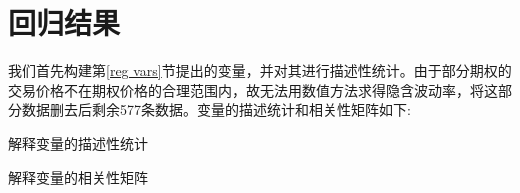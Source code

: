 \section{回归结果}
我们首先构建第\ref{reg vars}节提出的变量，并对其进行描述性统计。由于部分期权的交易价格不在期权价格的合理范围内，故无法用数值方法求得隐含波动率，将这部分数据删去后剩余577条数据。变量的描述统计和相关性矩阵如下:
\newpage
{}
\begin{landscape} 
    \begin{table}[H]
        \caption{解释变量的描述性统计}
        \resizebox{\linewidth}{!}{
        
        }
    \end{table}
    \begin{table}[H]
        \caption{解释变量的相关性矩阵}
        \resizebox{\linewidth}{!}{    }
    \end{table}    
\end{landscape}

